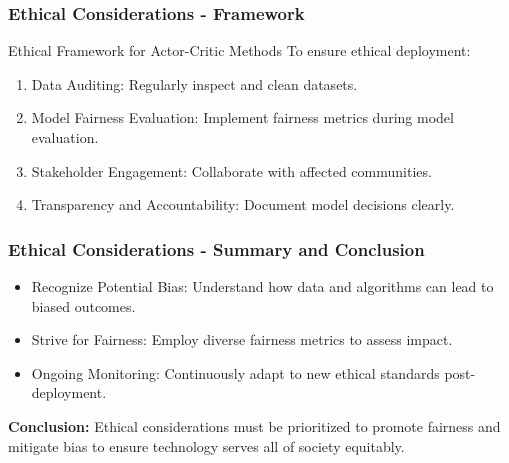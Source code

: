 \documentclass{beamer}
\begin{document}
\begin{frame}[fragile]
    \frametitle{Ethical Considerations - Framework}
    \begin{block}{Ethical Framework for Actor-Critic Methods}
        To ensure ethical deployment:
        \begin{enumerate}
            \item Data Auditing: Regularly inspect and clean datasets.
            \item Model Fairness Evaluation: Implement fairness metrics during model evaluation.
            \item Stakeholder Engagement: Collaborate with affected communities.
            \item Transparency and Accountability: Document model decisions clearly.
        \end{enumerate}
    \end{block}
\end{frame}

\begin{frame}[fragile]
    \frametitle{Ethical Considerations - Summary and Conclusion}
    \begin{itemize}
        \item Recognize Potential Bias: Understand how data and algorithms can lead to biased outcomes.
        \item Strive for Fairness: Employ diverse fairness metrics to assess impact.
        \item Ongoing Monitoring: Continuously adapt to new ethical standards post-deployment.
    \end{itemize}
    
    {\bf Conclusion:} Ethical considerations must be prioritized to promote fairness and mitigate bias to ensure technology serves all of society equitably.
\end{frame}
\end{document}
